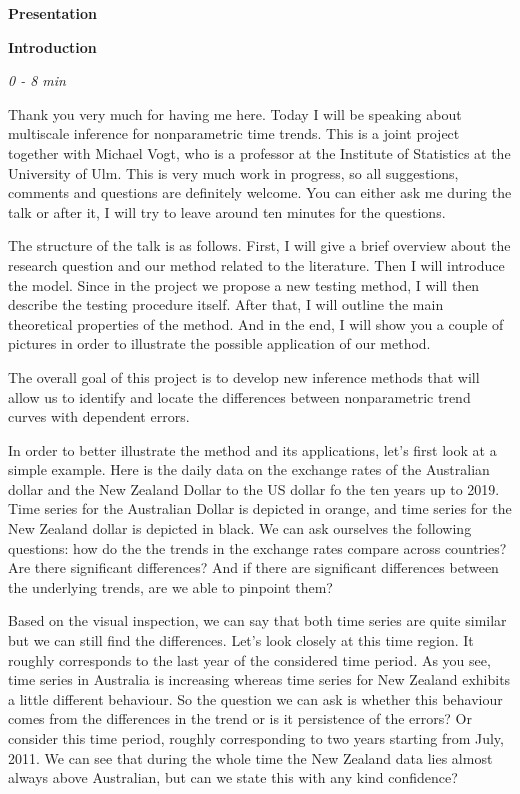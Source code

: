 \documentclass[a4paper,12pt]{article}
\begin{document}
\begin{center}
\Large{\textbf{Presentation}}
\end{center}
\textbf{Introduction}

\emph{0 - 8 min}

Thank you very much for having me here. Today I will be speaking about multiscale inference for nonparametric time trends. This is a joint project together with Michael Vogt, who is a professor at the Institute of Statistics at the University of Ulm. This is very much work in progress, so all suggestions, comments and questions are definitely welcome. You can either ask me during the talk or after it, I will try to leave around ten minutes for the questions.

The structure of the talk is as follows. First, I will give a brief overview about the research question and our method related to the literature. Then I will introduce the model. Since in the project we propose a new testing method, I will then describe the testing procedure itself. After that, I will outline the main theoretical properties of the method. And in the end, I will show you a couple of pictures in order to illustrate the possible application of our method.

The overall goal of this project is to develop new inference methods that will allow us to identify and locate the differences between nonparametric trend curves with dependent errors. 

In order to better illustrate the method and its applications, let's first look at a simple example. Here is the daily data on the exchange rates of the Australian dollar and the New Zealand Dollar to the US dollar fo the ten years up to 2019. Time series for the Australian Dollar is depicted in orange, and time series for the New Zealand dollar is depicted in black. We can ask ourselves the following questions: how do the the trends in the exchange rates compare across countries? Are there significant differences? And if there are significant differences between the underlying trends, are we able to pinpoint them?

Based on the visual inspection, we can say that both time series are quite similar but we can still find the differences. Let's look closely at this time region. It roughly corresponds to the last year of the considered time period. As you see, time series in Australia is increasing whereas time series for New Zealand exhibits a little different behaviour. So the question we can ask is whether this behaviour comes from the differences in the trend or is it persistence of the errors? Or consider this time period, roughly corresponding to two years starting from July, 2011. We can see that during the whole time the New Zealand data lies almost always above Australian, but can we state this with any kind confidence?
\end{document}
